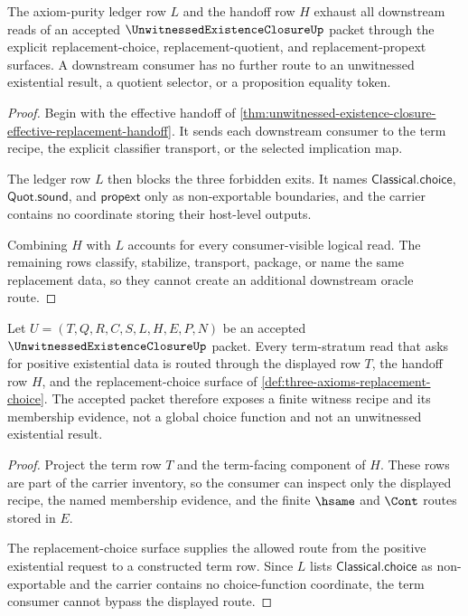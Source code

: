 \begin{theorem}
\label{thm:unwitnessed-existence-closure-ledger-handoff-exhaustion}
The axiom-purity ledger row $L$ and the handoff row $H$ exhaust all downstream reads of an accepted $\UnwitnessedExistenceClosureUp$ packet through the explicit replacement-choice, replacement-quotient, and replacement-propext surfaces. A downstream consumer has no further route to an unwitnessed existential result, a quotient selector, or a proposition equality token.
\end{theorem}
\begin{proof}
Begin with the effective handoff of \autoref{thm:unwitnessed-existence-closure-effective-replacement-handoff}. It sends each downstream consumer to the term recipe, the explicit classifier transport, or the selected implication map.

The ledger row $L$ then blocks the three forbidden exits. It names $\mathsf{Classical.choice}$, $\mathsf{Quot.sound}$, and $\mathsf{propext}$ only as non-exportable boundaries, and the carrier contains no coordinate storing their host-level outputs.

Combining $H$ with $L$ accounts for every consumer-visible logical read. The remaining rows classify, stabilize, transport, package, or name the same replacement data, so they cannot create an additional downstream oracle route.
\end{proof}

\begin{theorem}
\label{thm:unwitnessed-existence-closure-term-replacement-route}
Let $U=(T,Q,R,C,S,L,H,E,P,N)$ be an accepted $\UnwitnessedExistenceClosureUp$ packet. Every term-stratum read that asks for positive existential data is routed through the displayed row $T$, the handoff row $H$, and the replacement-choice surface of \autoref{def:three-axioms-replacement-choice}. The accepted packet therefore exposes a finite witness recipe and its membership evidence, not a global choice function and not an unwitnessed existential result.
\end{theorem}
\begin{proof}
Project the term row $T$ and the term-facing component of $H$. These rows are part of the carrier inventory, so the consumer can inspect only the displayed recipe, the named membership evidence, and the finite $\hsame$ and $\Cont$ routes stored in $E$.

The replacement-choice surface supplies the allowed route from the positive existential request to a constructed term row. Since $L$ lists $\mathsf{Classical.choice}$ as non-exportable and the carrier contains no choice-function coordinate, the term consumer cannot bypass the displayed route.
\end{proof}

